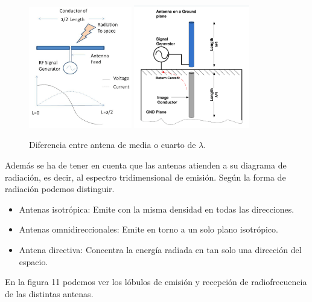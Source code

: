 \documentclass[paper=a4, fontsize=11pt,twoside]{scrartcl}	%
\begin{document}
            \begin{center}
                \begin{figure}[h]
                    \centering
                    \includegraphics[width=0.4\textwidth]{antenna_design.png}
                    \includegraphics[width=0.45\textwidth]{antenna_design_monopole.png}
                    \caption{Diferencia entre antena de media o cuarto de $\lambda$.}
                    \label{fig:mesh8}
                \end{figure}
            \end{center}
            Además se ha de tener en cuenta que las antenas atienden a su diagrama de radiación, es decir, al
            espectro tridimensional de emisión. Según la forma de radiación podemos distinguir.
            \begin{itemize}
                \item  Antenas isotrópica: Emite con la misma densidad en todas las direcciones.
                \item  Antenas omnidireccionales: Emite en torno a un solo plano isotrópico.
                \item  Antena directiva: Concentra la energía radiada en tan solo una dirección del espacio.
            \end{itemize}
            En la figura 11 podemos ver los lóbulos de emisión y recepción de radiofrecuencia de las distintas antenas.
\end{document}
